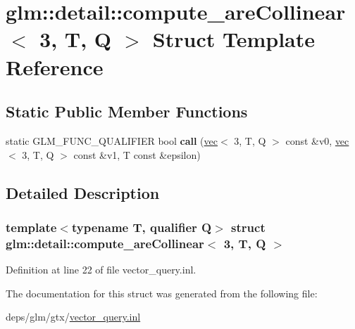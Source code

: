 \hypertarget{structglm_1_1detail_1_1compute__areCollinear_3_013_00_01T_00_01Q_01_4}{}\section{glm\+:\+:detail\+:\+:compute\+\_\+are\+Collinear$<$ 3, T, Q $>$ Struct Template Reference}
\label{structglm_1_1detail_1_1compute__areCollinear_3_013_00_01T_00_01Q_01_4}
\subsection*{Static Public Member Functions}
\begin{DoxyCompactItemize}
\item 
\mbox{\label{structglm_1_1detail_1_1compute__areCollinear_3_013_00_01T_00_01Q_01_4_ad89215d790bc1b3d246a597e261c32f4}} 
static G\+L\+M\+\_\+\+F\+U\+N\+C\+\_\+\+Q\+U\+A\+L\+I\+F\+I\+ER bool {\bfseries call} (\hyperlink{structglm_1_1vec}{vec}$<$ 3, T, Q $>$ const \&v0, \hyperlink{structglm_1_1vec}{vec}$<$ 3, T, Q $>$ const \&v1, T const \&epsilon)
\end{DoxyCompactItemize}


\subsection{Detailed Description}
\subsubsection*{template$<$typename T, qualifier Q$>$\newline
struct glm\+::detail\+::compute\+\_\+are\+Collinear$<$ 3, T, Q $>$}



Definition at line 22 of file vector\+\_\+query.\+inl.



The documentation for this struct was generated from the following file\+:\begin{DoxyCompactItemize}
\item 
deps/glm/gtx/\hyperlink{vector__query_8inl}{vector\+\_\+query.\+inl}\end{DoxyCompactItemize}
